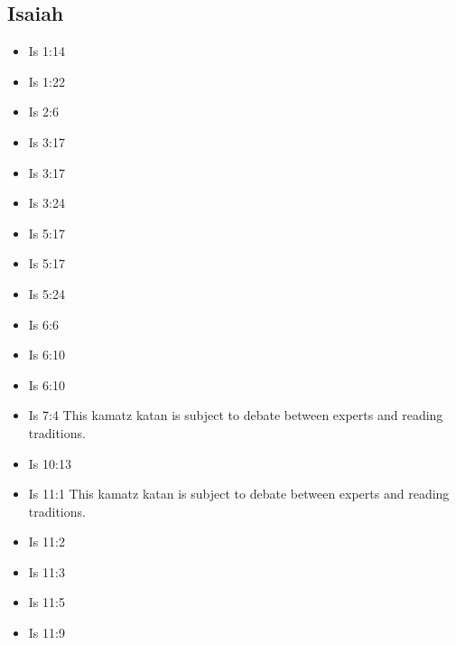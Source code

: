 \documentclass[14pt]{article}
\begin{document}
\subsection{Isaiah}
\begin{multicols}{2}\begin{itemize}

\item Is 1:14

\item Is 1:22

\item Is 2:6

\item Is 3:17

\item Is 3:17

\item Is 3:24

\item Is 5:17

\item Is 5:17

\item Is 5:24

\item Is 6:6

\item Is 6:10

\item Is 6:10

\item Is 7:4 This kamatz katan is subject to debate between experts and reading traditions.

\item Is 10:13

\item Is 11:1 This kamatz katan is subject to debate between experts and reading traditions.

\item Is 11:2

\item Is 11:3

\item Is 11:5

\item Is 11:9


\end{itemize}
\end{multicols}
\end{document}
